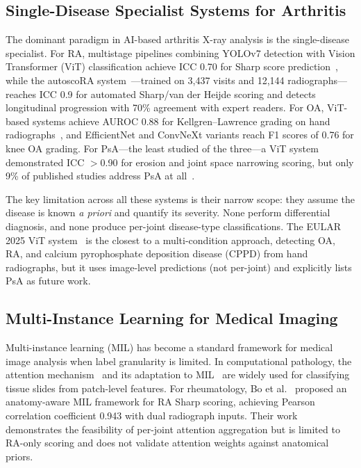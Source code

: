 \documentclass{article}
\begin{document}
\subsection{Single-Disease Specialist Systems for Arthritis}
The dominant paradigm in AI-based arthritis X-ray analysis is the single-disease specialist. For RA, multistage pipelines combining YOLOv7 detection with Vision Transformer (ViT) classification achieve ICC 0.70 for Sharp score prediction~\cite{scirep2025}, while the autoscoRA system~\cite{autoscora2026}---trained on 3,437 visits and 12,144 radiographs---reaches ICC 0.9 for automated Sharp/van der Heijde scoring and detects longitudinal progression with 70\% agreement with expert readers. For OA, ViT-based systems achieve AUROC 0.88 for Kellgren--Lawrence grading on hand radiographs~\cite{hugle2025}, and EfficientNet and ConvNeXt variants reach F1 scores of 0.76 for knee OA grading. For PsA---the least studied of the three---a ViT system~\cite{psavit2024} demonstrated ICC $>$0.90 for erosion and joint space narrowing scoring, but only 9\% of published studies address PsA at all~\cite{semin_arthritis2025}.

The key limitation across all these systems is their narrow scope: they assume the disease is known \emph{a priori} and quantify its severity. None perform differential diagnosis, and none produce per-joint disease-type classifications. The EULAR 2025 ViT system~\cite{hugle2025} is the closest to a multi-condition approach, detecting OA, RA, and calcium pyrophosphate deposition disease (CPPD) from hand radiographs, but it uses image-level predictions (not per-joint) and explicitly lists PsA as future work.

\subsection{Multi-Instance Learning for Medical Imaging}
Multi-instance learning (MIL) has become a standard framework for medical image analysis when label granularity is limited. In computational pathology, the attention mechanism~\cite{vaswani2017} and its adaptation to MIL~\cite{ilse2018} are widely used for classifying tissue slides from patch-level features. For rheumatology, Bo et al.~\cite{bo2025} proposed an anatomy-aware MIL framework for RA Sharp scoring, achieving Pearson correlation coefficient 0.943 with dual radiograph inputs. Their work demonstrates the feasibility of per-joint attention aggregation but is limited to RA-only scoring and does not validate attention weights against anatomical priors.
\end{document}
